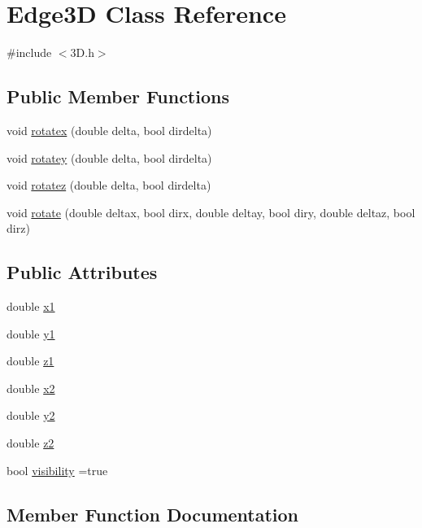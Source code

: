 \hypertarget{class_edge3_d}{}\section{Edge3D Class Reference}
\label{class_edge3_d}


{\ttfamily \#include $<$3\+D.\+h$>$}

\subsection*{Public Member Functions}
\begin{DoxyCompactItemize}
\item 
void \hyperlink{class_edge3_d_a4227087b7b6424239072a2ae42d31050}{rotatex} (double delta, bool dirdelta)
\item 
void \hyperlink{class_edge3_d_a196c44252817980785651de9d873e8a1}{rotatey} (double delta, bool dirdelta)
\item 
void \hyperlink{class_edge3_d_ab2be4120695452c1bcac60a0b0c69ef9}{rotatez} (double delta, bool dirdelta)
\item 
void \hyperlink{class_edge3_d_a046bd675865e96540831d41a02fbab52}{rotate} (double deltax, bool dirx, double deltay, bool diry, double deltaz, bool dirz)
\end{DoxyCompactItemize}
\subsection*{Public Attributes}
\begin{DoxyCompactItemize}
\item 
double \hyperlink{class_edge3_d_a228c499b53658e9770ac9383f05ae8f1}{x1}
\item 
double \hyperlink{class_edge3_d_ae106a8276a2ff4ded94a6bde8eece33b}{y1}
\item 
double \hyperlink{class_edge3_d_a87106a57b9e20b46cec47f62a510e86c}{z1}
\item 
double \hyperlink{class_edge3_d_aec211f03fd993aed5d510dfcab36aca2}{x2}
\item 
double \hyperlink{class_edge3_d_a7ef8a92f2478c20eafb32f1063987d64}{y2}
\item 
double \hyperlink{class_edge3_d_ac5993c7d892a67d35e43d9ca02320a78}{z2}
\item 
bool \hyperlink{class_edge3_d_adf1e11b5b589bd18d9a1a09b30379217}{visibility} =true
\end{DoxyCompactItemize}


\subsection{Member Function Documentation}

